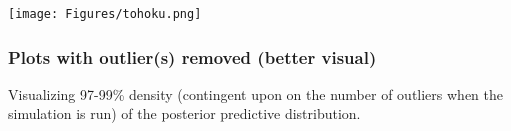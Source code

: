 \begin{Shaded}
\begin{Highlighting}[]

\NormalTok{, }\NormalTok{(} \SpecialCharTok{/}\SpecialCharTok{\^{}}\SpecialCharTok{+}
\NormalTok{() }\SpecialCharTok{+} 
    \NormalTok{(} \NormalTok{,}
          \NormalTok{,}
          \NormalTok{,}
          \NormalTok{) }\SpecialCharTok{+}
  \NormalTok{()}
\end{Highlighting}
\end{Shaded}

\texttt{[image: Figures/tohoku.png]}

\hypertarget{plots-with-outliers-removed-better-visual}{%
\subsubsection{Plots with outlier(s) removed (better
visual)}\label{plots-with-outliers-removed-better-visual}}

Visualizing 97-99\% density (contingent upon on the number of outliers
when the simulation is run) of the posterior predictive distribution.


